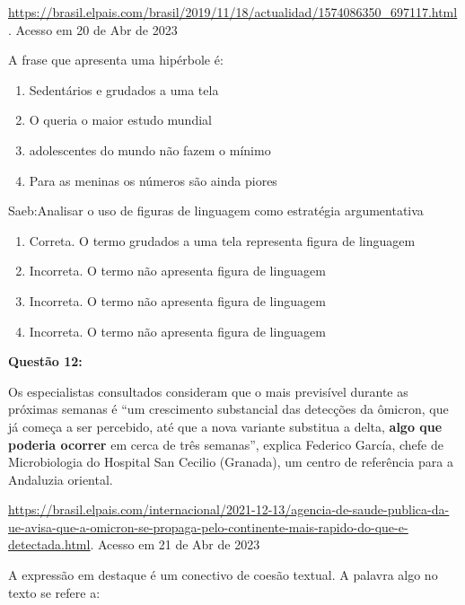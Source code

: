 {\href{https://brasil.elpais.com/brasil/2019/11/18/actualidad/1574086350_697117.html}{\uline{https://brasil.elpais.com/brasil/2019/11/18/actualidad/1574086350\_697117.html}}.
Acesso em 20 de Abr de 2023

A frase que apresenta uma hipérbole é:

\begin{enumerate}
\def\labelenumi{\alph{enumi})}
\item
  Sedentários e grudados a uma tela
\item
  O queria o maior estudo mundial
\item
  adolescentes do mundo não fazem o mínimo
\item
  Para as meninas os números são ainda piores
\end{enumerate}

Saeb:Analisar o uso de figuras de linguagem como estratégia
argumentativa

\begin{enumerate}
\def\labelenumi{\arabic{enumi}.}
\item
  Correta. O termo grudados a uma tela representa figura de linguagem
\item
  Incorreta. O termo não apresenta figura de linguagem
\item
  Incorreta. O termo não apresenta figura de linguagem
\item
  Incorreta. O termo não apresenta figura de linguagem
\end{enumerate}

\textbf{Questão 12:}

Os especialistas consultados consideram que o mais previsível durante as
próximas semanas é ``um crescimento substancial das detecções da
ômicron, que já começa a ser percebido, até que a nova variante
substitua a delta, \textbf{algo que poderia ocorrer} em cerca de três
semanas'', explica Federico García, chefe de Microbiologia do Hospital
San Cecilio (Granada), um centro de referência para a Andaluzia
oriental.

\href{https://brasil.elpais.com/internacional/2021-12-13/agencia-de-saude-publica-da-ue-avisa-que-a-omicron-se-propaga-pelo-continente-mais-rapido-do-que-e-detectada.html}{\uline{https://brasil.elpais.com/internacional/2021-12-13/agencia-de-saude-publica-da-ue-avisa-que-a-omicron-se-propaga-pelo-continente-mais-rapido-do-que-e-detectada.html}}.
Acesso em 21 de Abr de 2023

A expressão em destaque é um conectivo de coesão textual. A palavra algo
no texto se refere a:

}
